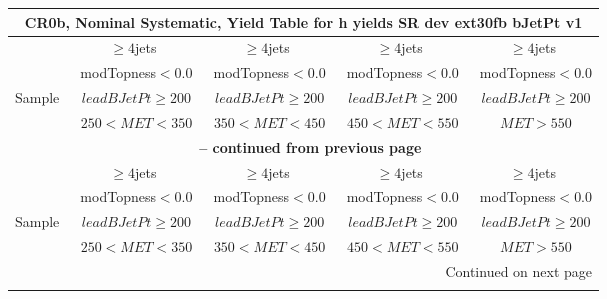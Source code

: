 \documentclass{article}
\begin{document}
\begin{longtable}{|l|c|c|c|c|} 
 
\multicolumn{5}{c}{ CR0b, Nominal Systematic, Yield Table for h yields SR dev ext30fb bJetPt v1 }\\* \hline 
  & $\ge4$jets  & $\ge4$jets  & $\ge4$jets  & $\ge4$jets \\* 
  & ~modTopness$<0.0$  & ~modTopness$<0.0$  & ~modTopness$<0.0$  & ~modTopness$<0.0$ \\* 
Sample  & ~$leadBJetPt\ge200$  & ~$leadBJetPt\ge200$  & ~$leadBJetPt\ge200$  & ~$leadBJetPt\ge200$ \\* 
  & ~$250<MET<350$  & ~$350<MET<450$  & ~$450<MET<550$  & ~$MET>550$ \\* 
\hline \hline 
\endfirsthead 
 
\multicolumn{5}{c}{{\bfseries \tablename\ \thetable{} -- continued from previous page}}\\* \hline 
  & $\ge4$jets  & $\ge4$jets  & $\ge4$jets  & $\ge4$jets \\* 
  & ~modTopness$<0.0$  & ~modTopness$<0.0$  & ~modTopness$<0.0$  & ~modTopness$<0.0$ \\* 
Sample  & ~$leadBJetPt\ge200$  & ~$leadBJetPt\ge200$  & ~$leadBJetPt\ge200$  & ~$leadBJetPt\ge200$ \\* 
  & ~$250<MET<350$  & ~$350<MET<450$  & ~$450<MET<550$  & ~$MET>550$ \\* 
\hline \hline 
\endhead 
 
\multicolumn{5}{|r|}{{Continued on next page}}\\* \hline 
\endfoot 
 
 
\endlastfoot 
 

\end{longtable}
\end{document}
